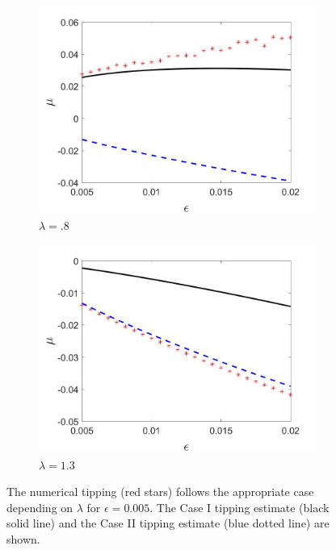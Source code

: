 \begin{figure}[H]
\centering
\begin{subfigure}{.5\textwidth}
  \centering
  \includegraphics[width=\linewidth]{oneD/slowosc_epscomp_case2.jpg}
  \caption{$\lambda=.8$}
\end{subfigure}%
\begin{subfigure}{.5\textwidth}
  \centering
  \includegraphics[width=\linewidth]{oneD/slowosc_epscomp_case3.jpg}
  \caption{$\lambda=1.3$}
\end{subfigure}
\caption{The numerical tipping (red stars) follows the appropriate case depending on $\lambda$ for $\epsilon=0.005$. The Case I tipping estimate (black solid line) and the Case II tipping estimate (blue dotted line) are shown.}
\label{fig:oneD_slowosc_epscomp}
\end{figure}

